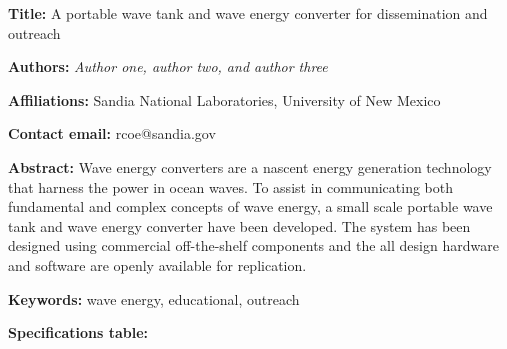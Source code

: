 \documentclass[11pt, letterpaper]{article}
\begin{document}
\begin{flushleft}


\setlength{\parindent}{0pt}
\setlength{\parskip}{10pt}

\textbf{Title:} A portable wave tank and wave energy converter for dissemination and outreach

\textbf{Authors:} \textit{Author one, author two, and author three}

\textbf{Affiliations:} Sandia National Laboratories, University of New Mexico

\textbf{Contact email:} rcoe@sandia.gov

\textbf{Abstract:} Wave energy converters are a nascent energy generation technology that harness the power in ocean waves.
To assist in communicating both fundamental and complex concepts of wave energy, a small scale portable wave tank and wave energy converter have been developed.
The system has been designed using commercial off-the-shelf components and the all design hardware and software are openly available for replication.

\textbf{Keywords:} wave energy, educational, outreach

\textbf{Specifications table:}


\end{flushleft}
\end{document}
